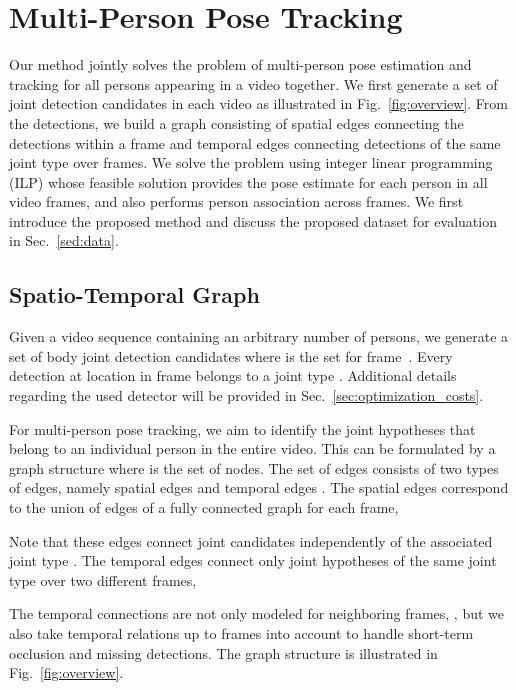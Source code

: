 \documentclass[10pt,twocolumn,letterpaper]{article}
\begin{document}
\section{Multi-Person Pose Tracking}
\label{sec:joint_pose_estimation_and_tracking}

Our method jointly solves the problem of multi-person pose estimation and tracking for all persons appearing in a video together. We first generate a set of joint detection candidates in each video as illustrated in Fig.~\ref{fig:overview}. From the detections, we build a graph consisting of spatial edges connecting the detections within a frame and temporal edges connecting detections of the same joint type over frames.   
We solve the problem using integer linear programming (ILP) whose feasible solution provides the pose estimate for each person in all video frames, and also performs person association across frames.
We first introduce the proposed method and discuss the proposed dataset for evaluation in Sec.~\ref{sed:data}.

\subsection{Spatio-Temporal Graph}\label{sec:graph}
Given a video sequence  containing an arbitrary number of persons, we generate a set of body joint detection candidates  where  is the set for frame~. Every detection  at location  in frame  belongs to a joint type . Additional details regarding the used detector will be provided in Sec.~\ref{sec:optimization_costs}.




For multi-person pose tracking, we aim to identify the joint hypotheses that belong to an individual person in the entire video. This can be formulated by a graph structure  where  is the set of nodes. The set of edges  consists of two types of edges, namely spatial edges  and temporal edges . The spatial edges correspond to the union of edges of a fully connected graph for each frame, \ie 

Note that these edges connect joint candidates independently of the associated joint type . The temporal edges connect only joint hypotheses of the same joint type over two different frames, \ie 

The temporal connections are not only modeled for neighboring frames, \ie , but we also take temporal relations up to  frames into account to handle short-term occlusion and missing detections. The graph structure is illustrated in Fig.~\ref{fig:overview}.                      
\end{document}
